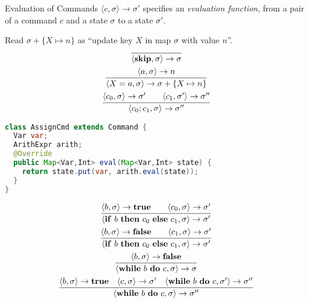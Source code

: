 \begin{frame}[fragile]{Evaluation of Commands}
    $\langle c, \sigma \rangle \rightarrow \sigma'$ specifies an
    \emph{evaluation function}, from a pair of a command $c$ and a state
    $\sigma$ to a state $\sigma'$.
    \begin{overprint}
        Read $\sigma + \{X \mapsto n\}$ as ``update key $X$ in map $\sigma$ with value $n$''.
        \begin{gather*}
            \infer{\langle \mathbf{skip}, \sigma \rangle \rightarrow \sigma}{} \\
            \infer{\langle X = a , \sigma \rangle \rightarrow \sigma + \{X \mapsto n\}}{\langle a , \sigma \rangle \rightarrow n} \\
            \infer{\langle c_0; c_1 , \sigma \rangle \rightarrow \sigma''}{\langle c_0 , \sigma \rangle \rightarrow  \sigma' \qquad \langle c_1 , \sigma' \rangle \rightarrow \sigma''}
        \end{gather*}
        \begin{lstlisting}[language=java, basicstyle=\small]
class AssignCmd extends Command {
  Var var;
  ArithExpr arith;
  @Override
  public Map<Var,Int> eval(Map<Var,Int> state) {
    return state.put(var, arith.eval(state));
  }
}
        \end{lstlisting}
        \begin{gather*}
            \infer{\langle \mathbf{if}\ b\ \mathbf{then}\ c_0\ \mathbf{else}\ c_1, \sigma \rangle \rightarrow \sigma'}{\langle b , \sigma \rangle \rightarrow  \mathbf{true} \qquad \langle c_0 , \sigma \rangle \rightarrow \sigma'} \\
            \infer{\langle \mathbf{if}\ b\ \mathbf{then}\ c_0\ \mathbf{else}\ c_1, \sigma \rangle \rightarrow \sigma'}{\langle b , \sigma \rangle \rightarrow  \mathbf{false} \qquad \langle c_1 , \sigma \rangle \rightarrow \sigma'} \\
            \infer{\langle \mathbf{while}\ b\ \mathbf{do}\ c, \sigma \rangle \rightarrow \sigma}{\langle b , \sigma \rangle \rightarrow  \mathbf{false} } \\
            \infer{\langle \mathbf{while}\ b\ \mathbf{do}\ c, \sigma \rangle \rightarrow \sigma''}{\langle b , \sigma \rangle \rightarrow  \mathbf{true} \quad \langle c , \sigma \rangle \rightarrow \sigma' \quad \langle \mathbf{while}\ b\ \mathbf{do}\ c, \sigma' \rangle \rightarrow \sigma''}
        \end{gather*}
    \end{overprint}
\end{frame}

